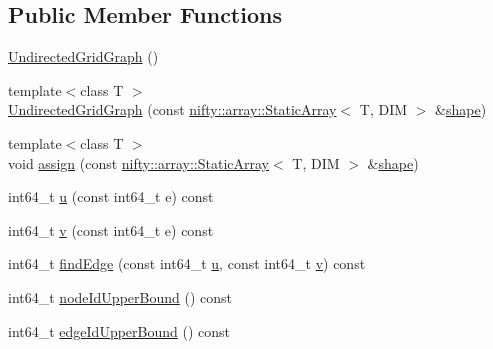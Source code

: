 \subsection*{Public Member Functions}
\begin{DoxyCompactItemize}
\item 
\hyperlink{classnifty_1_1graph_1_1UndirectedGridGraph_3_01DIM_00_01true_01_4_ae07e559f9d33b543c69a6466bbc10348}{Undirected\+Grid\+Graph} ()
\item 
{\footnotesize template$<$class T $>$ }\\\hyperlink{classnifty_1_1graph_1_1UndirectedGridGraph_3_01DIM_00_01true_01_4_a6776a2c7c54036eb5c4df8045c6a7d44}{Undirected\+Grid\+Graph} (const \hyperlink{namespacenifty_1_1array_a683f151f19c851754e0c6d55ed16a0c2}{nifty\+::array\+::\+Static\+Array}$<$ T, D\+I\+M $>$ \&\hyperlink{classnifty_1_1graph_1_1UndirectedGridGraph_3_01DIM_00_01true_01_4_aae07f158c9e01de28f520a587a92e4e0}{shape})
\item 
{\footnotesize template$<$class T $>$ }\\void \hyperlink{classnifty_1_1graph_1_1UndirectedGridGraph_3_01DIM_00_01true_01_4_ad966a5e524bba56b8096c999d41bfeae}{assign} (const \hyperlink{namespacenifty_1_1array_a683f151f19c851754e0c6d55ed16a0c2}{nifty\+::array\+::\+Static\+Array}$<$ T, D\+I\+M $>$ \&\hyperlink{classnifty_1_1graph_1_1UndirectedGridGraph_3_01DIM_00_01true_01_4_aae07f158c9e01de28f520a587a92e4e0}{shape})
\item 
int64\+\_\+t \hyperlink{classnifty_1_1graph_1_1UndirectedGridGraph_3_01DIM_00_01true_01_4_ab9fb4ee38640d191bc349a9c10e1bd09}{u} (const int64\+\_\+t e) const 
\item 
int64\+\_\+t \hyperlink{classnifty_1_1graph_1_1UndirectedGridGraph_3_01DIM_00_01true_01_4_a803aedb88e20114b37b34bd246858e63}{v} (const int64\+\_\+t e) const 
\item 
int64\+\_\+t \hyperlink{classnifty_1_1graph_1_1UndirectedGridGraph_3_01DIM_00_01true_01_4_af4a61ee4323c7246f0464dce726b7c58}{find\+Edge} (const int64\+\_\+t \hyperlink{classnifty_1_1graph_1_1UndirectedGridGraph_3_01DIM_00_01true_01_4_ab9fb4ee38640d191bc349a9c10e1bd09}{u}, const int64\+\_\+t \hyperlink{classnifty_1_1graph_1_1UndirectedGridGraph_3_01DIM_00_01true_01_4_a803aedb88e20114b37b34bd246858e63}{v}) const 
\item 
int64\+\_\+t \hyperlink{classnifty_1_1graph_1_1UndirectedGridGraph_3_01DIM_00_01true_01_4_a8c037223cb2e3037a607978435ee1b52}{node\+Id\+Upper\+Bound} () const 
\item 
int64\+\_\+t \hyperlink{classnifty_1_1graph_1_1UndirectedGridGraph_3_01DIM_00_01true_01_4_a8c7941e7700cddaacdba339a8cbd9959}{edge\+Id\+Upper\+Bound} () const 

\end{DoxyCompactItemize}
